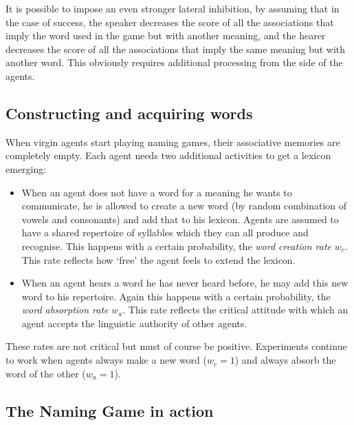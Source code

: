 It is possible to impose an even stronger
lateral inhibition, by assuming that in the case of 
success, the speaker decreases the score of 
all the associations that imply the word used in 
the game but with another meaning, and the 
hearer decreases the score of all the associations
that imply the same meaning but with another 
word. This obviously requires additional processing
from the side of the agents. 

\subsection{Constructing and acquiring words}

When virgin agents start playing naming games, their 
associative memories are completely empty. Each agent 
needs two additional activities to get a lexicon
emerging: 
\begin{itemize}
\item 
When an agent does not have a word for a
meaning he wants to communicate, he is allowed to create
a new word (by random combination of vowels and 
consonants) and add that to his 
lexicon. Agents are assumed to have a 
shared repertoire of syllables which they can all 
produce and recognise. This happens with a certain 
probability, the {\it word creation rate} $w_{c}$. 
This rate reflects how `free' the agent feels to 
extend the lexicon. 
\item 
When an agent hears a word he has 
never heard before, he may add this new word to his 
repertoire. Again this happens with a certain
probability, the {\it word absorption rate} $w_{a}$. 
This rate reflects the critical attitude with which an 
agent accepts the linguistic authority of other agents. 
\end{itemize}
These rates are not critical but must of course
be positive. Experiments continue to work 
when agents always make a new word ($w_{c}=1$) 
and always absorb the word of the other ($w_{a}=1$). 

\subsection{The Naming Game in action}
 
